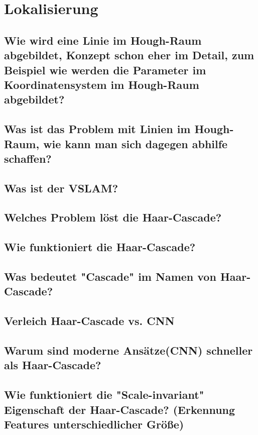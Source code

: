 \section{Lokalisierung}

\subsection{Wie wird eine Linie im Hough-Raum abgebildet, Konzept schon eher im Detail, zum Beispiel wie werden die Parameter im Koordinatensystem im Hough-Raum abgebildet?}

\subsection{Was ist das Problem mit Linien im Hough-Raum, wie kann man sich dagegen abhilfe schaffen?}

\subsection{Was ist der VSLAM?}

\subsection{Welches Problem löst die Haar-Cascade?}

\subsection{Wie funktioniert die Haar-Cascade?}

\subsection{Was bedeutet "Cascade" im Namen von Haar-Cascade?}

\subsection{Verleich Haar-Cascade vs. CNN}

\subsection{Warum sind moderne Ansätze(CNN) schneller als Haar-Cascade?}

\subsection{Wie funktioniert die "Scale-invariant" Eigenschaft der Haar-Cascade? (Erkennung Features unterschiedlicher Größe)}

